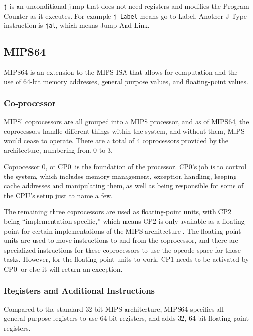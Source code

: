 \documentclass[
    paper=letter,
    parskip=half,
    fontsize=12pt,
    titlepage=firstiscover,
    toc=bibliography,
    numbers=endperiod
]{scrartcl}
\begin{document}
\texttt{j} is an unconditional jump that does not need registers and
modifies the Program Counter as it executes. For example \texttt{j
    Label} means go to Label. Another J-Type instruction is \texttt{jal},
which means Jump And Link.

\subsection{MIPS64}
\label{sec:mips64}

MIPS64 is an extension to the MIPS ISA that allows for computation and
the use of 64-bit memory addresses, general purpose values, and
floating-point values.

\subsubsection{Co-processor}

MIPS' coprocessors are all grouped into a MIPS processor, and as of
MIPS64, the coprocessors handle different things within the system, and
without them, MIPS would cease to operate. There are a total of 4
coprocessors provided by the architecture, numbering from 0 to 3.

Coprocessor 0, or CP0, is the foundation of the processor. CP0's job is
to control the system, which includes memory management, exception
handling, keeping cache addresses and manipulating them, as well as
being responsible for some of the CPU's setup just to name a few.

The remaining three coprocessors are used as floating-point units, with
CP2 being ``implementation-specific,'' which means CP2 is only available
as a floating point for certain implementations of the MIPS architecture
\cite[p.~74]{mips-specification}. The floating-point units are used to
move instructions to and from the coprocessor, and there are specialized
instructions for these coprocessors to use the opcode space for those
tasks. However, for the floating-point units to work, CP1 needs to be
activated by CP0, or else it will return an exception.

\subsubsection{Registers and Additional Instructions}

Compared to the standard 32-bit MIPS architecture, MIPS64 specifies all
general-purpose registers to use 64-bit registers, and adds 32, 64-bit
floating-point registers.
\end{document}
